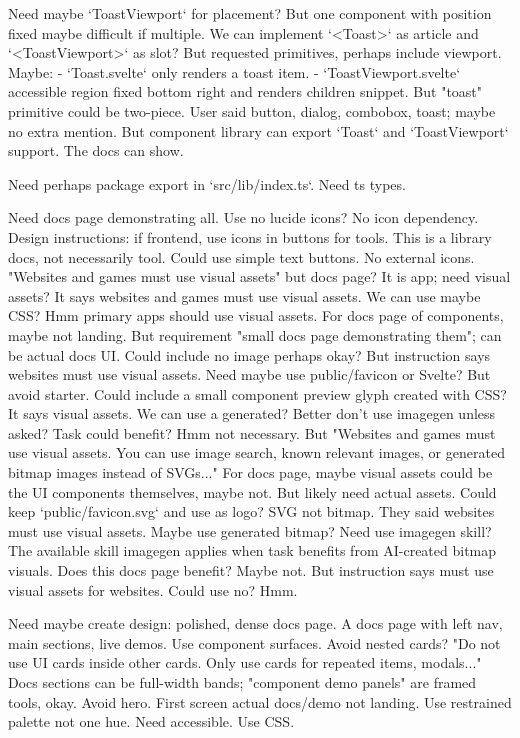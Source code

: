 \begin{decodedreasoningpanel}
Need maybe `ToastViewport` for placement? But one component with position fixed maybe difficult if multiple. We can implement `<Toast>` as article and `<ToastViewport>` as slot? But requested primitives, perhaps include viewport. Maybe:
- `Toast.svelte` only renders a toast item.
- `ToastViewport.svelte` accessible region fixed bottom right and renders children snippet.
But "toast" primitive could be two-piece. User said button, dialog, combobox, toast; maybe no extra mention. But component library can export `Toast` and `ToastViewport` support. The docs can show.

Need perhaps package export in `src/lib/index.ts`. Need ts types.

Need docs page demonstrating all. Use no lucide icons? No icon dependency. Design instructions: if frontend, use icons in buttons for tools. This is a library docs, not necessarily tool. Could use simple text buttons. No external icons. "Websites and games must use visual assets" but docs page? It is app; need visual assets? It says websites and games must use visual assets. We can use maybe CSS? Hmm primary apps should use visual assets. For docs page of components, maybe not landing. But requirement "small docs page demonstrating them"; can be actual docs UI. Could include no image
perhaps okay? But instruction says websites must use visual assets. Need maybe use public/favicon or Svelte? But avoid starter. Could include a small component preview glyph created with CSS? It says visual assets. We can use a generated? Better don't use imagegen unless asked? Task could benefit? Hmm not necessary. But "Websites and games must use visual assets. You can use image search, known relevant images, or generated bitmap images instead of SVGs..." For docs page, maybe visual assets could be the UI components themselves, maybe not. But likely need actual assets. Could keep `public/favicon.svg` and use as logo? SVG not bitmap. They said websites must use visual assets. Maybe use generated bitmap? Need use imagegen skill? The available skill imagegen applies when task benefits from AI-created bitmap visuals. Does this docs page benefit? Maybe not. But instruction says must use visual assets for websites. Could use no? Hmm.

Need maybe create design: polished, dense docs page. A docs page with left nav, main sections, live demos. Use component surfaces. Avoid nested cards? "Do not use UI cards inside other cards. Only use cards for repeated items, modals..." Docs sections can be full-width bands; "component demo panels" are framed tools, okay. Avoid hero. First screen actual docs/demo not landing. Use restrained palette not one hue. Need accessible. Use CSS.


\end{decodedreasoningpanel}
